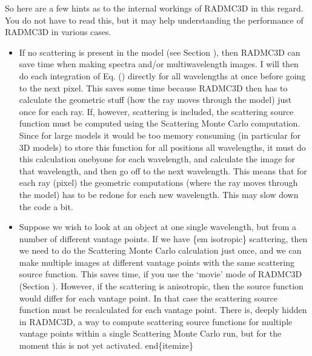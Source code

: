 \documentclass[letterpaper,10pt,english]{sphinxmanual}
\begin{document}
So here are a few hints as to the internal workings of RADMC\sphinxhyphen{}3D in this
regard. You do not have to read this, but it may help understanding the
performance of RADMC\sphinxhyphen{}3D in various cases.
\begin{itemize}
\item {} 

If no scattering is present in the model (see Section
{\hyperref[\detokenize{dustradtrans:sec-modes-of-scattering}]{}}), then RADMC\sphinxhyphen{}3D can save time when making
spectra and/or multi\sphinxhyphen{}wavelength images. I will then do each integration of
Eq. () directly for all wavelengths at once before
going to the next pixel. This saves some time because RADMC\sphinxhyphen{}3D then has to
calculate the geometric stuff (how the ray moves through the model) just once
for each ray. If, however, scattering is included, the scattering source
function must be computed using the Scattering Monte Carlo computation. Since
for large models it would be too memory consuming (in particular for 3\sphinxhyphen{}D
models) to store this function for all positions  all wavelengths, it
must do this calculation one\sphinxhyphen{}by\sphinxhyphen{}one for each wavelength, and calculate the
image for that wavelength, and then go off to the next wavelength. This means
that for each ray (pixel) the geometric computations (where the ray moves
through the model) has to be redone for each new wavelength. This may slow
down the code a bit.

\item {} 

Suppose we wish to look at an object at one single wavelength, but from a
number of different vantage points. If we have \{em isotropic\} scattering,
then we need to do the Scattering Monte Carlo calculation just once, and we
can make multiple images at different vantage points with the same scattering
source function. This saves time, if you use the ‘movie’ mode of RADMC\sphinxhyphen{}3D
(Section {\hyperref[\detokenize{imagesspectra:sec-movie-mode}]{}}). However, if the scattering is anisotropic,
then the source function would differ for each vantage point.  In that case
the scattering source function must be recalculated for each vantage
point. There is, deeply hidden in RADMC\sphinxhyphen{}3D, a way to compute scattering source
functions for multiple vantage points within a single Scattering Monte Carlo
run, but for the moment this is not yet activated.  end\{itemize\}

\end{itemize}
\end{document}
